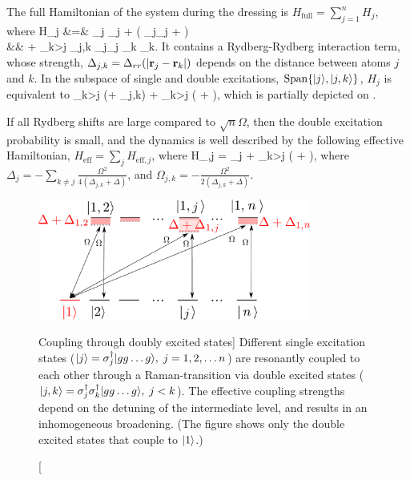 The full Hamiltonian of the system during the dressing is $H_\mathrm{full}
= \sum_{j=1}^n H_j$, where
\bal
	H_j &=&  \Delta\sigma_j\+ \sigma_j + \big(
	_j_j + \big)
	\nonumber\\
	&& +
	\sum_{k>j} \Delta_{j,k} \sigma_j\+\sigma_j \sigma_k\+
	\sigma_k.
\eal
It contains a Rydberg-Rydberg interaction term, whose strength,
$\Delta_{j,k} = \Delta_{rr}(|{\mathbf r}_j - {\mathbf r}_k|)$ depends on the
distance between atoms $j$ and $k$. In the subspace of single and double
excitations, $\mathrm{Span}\{| j \rangle, | j,k \rangle\}$, $H_j$ is equivalent to
\bel
	\sum_{k>j} (\Delta + \Delta_{j,k})  +
	\sum_{k>j} \big(  +  \big),
\eel
which is partially depicted on .

If all Rydberg shifts are large compared to
$\sqrt{n}\Omega$, then the double excitation probability is small, and the
dynamics is well described by the following effective Hamiltonian, $H_\mathrm{eff} = \sum_j
H_{\mathrm{eff}, j}$, where 
\bel
\label{eq:H_eff}
	H_{,j} = \Delta_j  + \sum_{k>j}
	 \big(  +  \big),
\eel
where $\Delta_j = -\sum_{k\neq j}\frac{\Omega^2}{4(\Delta_{j,k} + \Delta)}$, and    
$\Omega_{j,k} = -\frac{\Omega^2}{2(\Delta_{j,k} + \Delta)}$.
\begin{figure}[h]
\centering
\includegraphics[width=0.80\textwidth]
{./figs_Komar2015/coupling_1_2_smalln_only1.pdf} 
\caption
[Coupling through doubly excited states]
{
\label{fig:coupling 1,2}   
Different single excitation states ($| j \rangle = \sigma_j^\dagger | gg\dots g \rangle, \; j
= 1,2,\dots n$) are resonantly coupled to each other through a Raman-transition
via double excited states ($| j,k \rangle = \sigma_j^\dagger\sigma_k^\dagger| gg\dots g \rangle,\;
j < k$). The effective coupling strengths depend on the detuning of the
intermediate level, and results in an inhomogeneous broadening. (The figure
shows only the double excited states that couple to $| 1 \rangle$.)}
\end{figure}

